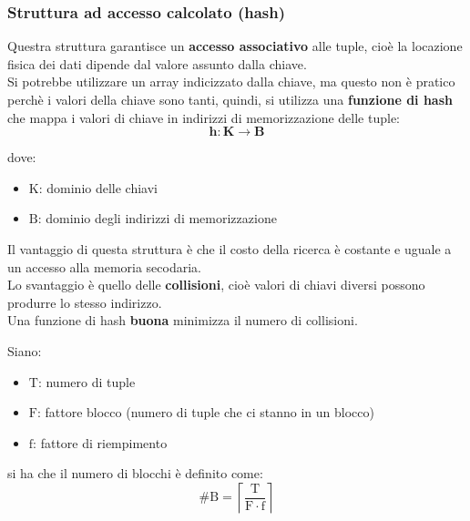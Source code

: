 \subsubsection{Struttura ad accesso calcolato (hash)}
Questra struttura garantisce un \textbf{accesso associativo} alle tuple, cioè la locazione fisica dei dati dipende dal valore assunto dalla chiave.\\[0.2ex]
Si potrebbe utilizzare un array indicizzato dalla chiave, ma questo non è pratico perchè i valori della chiave sono tanti, quindi, si utilizza una \textbf{funzione di hash} che mappa i valori di chiave in indirizzi di memorizzazione delle tuple:
\begin{equation*}
  \mathbf{h : K \rightarrow B}
\end{equation*}

dove:
\begin{itemize}[label=$\triangleright$, itemsep=\smallskipamount]
  \item $\mathrm{K}$: dominio delle chiavi
  \item $\mathrm{B}$: dominio degli indirizzi di memorizzazione
\end{itemize}

Il vantaggio di questa struttura è che il costo della ricerca è costante e uguale a un accesso alla memoria secodaria.\\[0.2ex]
Lo svantaggio è quello delle \textbf{collisioni}, cioè valori di chiavi diversi possono produrre lo stesso indirizzo.\\[0.2ex]
Una funzione di hash \textbf{buona} minimizza il numero di collisioni.


Siano:
\begin{itemize}[label=$\triangleright$, itemsep=\smallskipamount]
  \item $\mathrm{T}$: numero di tuple
  \item $\mathrm{F}$: fattore blocco (numero di tuple che ci stanno in un blocco)
  \item $\mathrm{f}$: fattore di riempimento
\end{itemize}

si ha che il numero di blocchi è definito come:
\begin{equation*}
  \boldsymbol{\mathrm{\# B = \left\lceil \frac{T}{F \cdot f} \right\rceil}}
\end{equation*}

